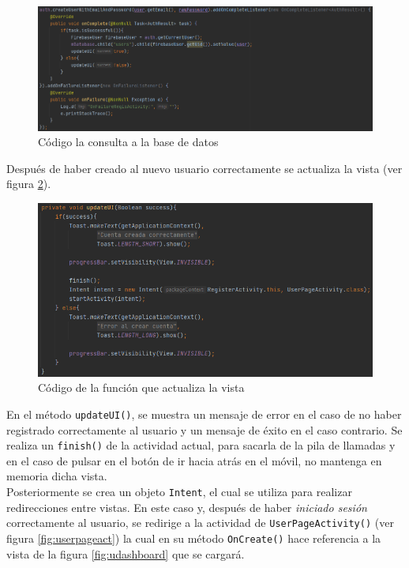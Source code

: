 \begin{figure}[H]
    \centering
    \includegraphics[width=\textwidth]{Images/Capitulo7/bdreg.png}
        \caption{Código la consulta a la base de datos}
    \label{fig:bdreg}
\end{figure}
Después de haber creado al nuevo usuario correctamente se actualiza la vista (ver figura \ref{fig:updateui}).
\begin{figure}[H]
    \centering
    \includegraphics[width=\textwidth]{Images/Capitulo7/updateui.png}
        \caption{Código de la función que actualiza la vista}
    \label{fig:updateui}
\end{figure}

En el método \texttt{updateUI()}, se muestra un mensaje de error en el caso de no haber registrado correctamente al usuario y un mensaje de éxito en el caso contrario.
Se realiza un \texttt{finish()} de la actividad actual, para sacarla de la pila de llamadas y en el caso de pulsar en el botón de ir hacia atrás en el móvil, no mantenga en memoria dicha vista.\\
Posteriormente se crea un objeto \texttt{Intent}, el cual se utiliza para realizar redirecciones entre vistas. En este caso y, después de haber \textit{iniciado sesión} correctamente al usuario, se redirige a la actividad de \texttt{UserPageActivity()} (ver figura \ref{fig:userpageact}) la cual en su método \texttt{OnCreate()} hace referencia a la vista de la figura \ref{fig:udashboard} que se cargará.

